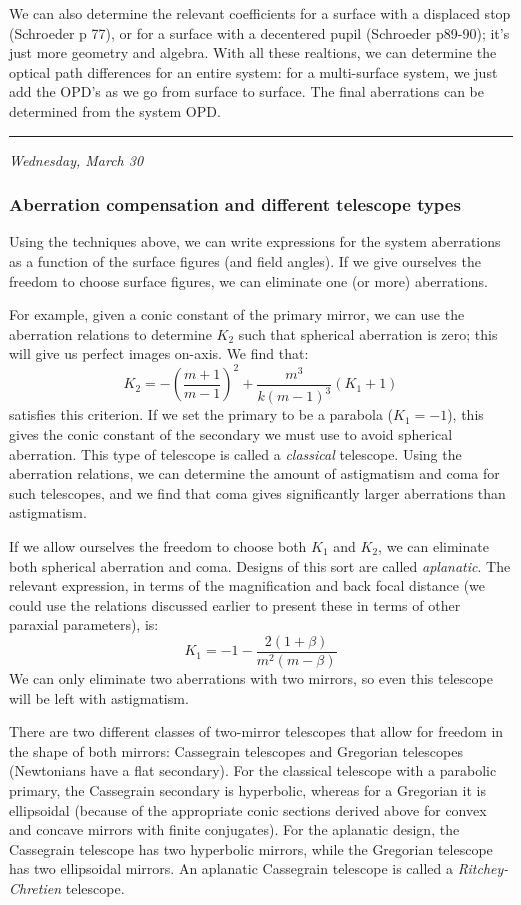 \documentclass[12pt]{article}
\newcommand{\mydate}[1]{
    \begin{flushright}
        \rule{\textwidth}{0.4pt} %
        \footnotesize\hfill\textit{#1}
    \end{flushright}}
\begin{document}
We can also determine the relevant coefficients for a surface with a displaced
stop (Schroeder p 77), or for a surface with a decentered pupil (Schroeder
p89-90); it's just more geometry and algebra. With all these realtions, we can
determine the optical path differences for an entire system: for a
multi-surface system, we just add the OPD's as we go from surface to surface.
The final aberrations can be determined from the system OPD.

\mydate{Wednesday, March 30}
\subsubsection{Aberration compensation and different telescope types}
Using the techniques above, we can write expressions for the system
aberrations as a function of the surface figures (and field angles).
If we give ourselves the freedom to choose surface figures, we can
eliminate one (or more) aberrations.

For example, given a conic constant of the primary mirror, we can use
the aberration relations to determine $K_{2}$ such that spherical
aberration is zero; this will give us perfect images on-axis. We find
that:
\[
    K_{2} =
    - \left( \frac{m+1}{m-1} \right) ^{2}
    + \frac{m^{3}}{k \left( m - 1 \right) ^{3}} \left( K_{1} + 1 \right)
    \]
satisfies this criterion.  If we set the primary to be a parabola ($K_{1} =
-1$), this gives the conic constant of the secondary we must use to avoid
spherical aberration. This type of telescope is called a \textit{classical}
telescope. Using the aberration relations, we can determine the amount of
astigmatism and coma for such telescopes, and we find that coma gives
significantly larger aberrations than astigmatism.

If we allow ourselves the freedom to choose both $K_{1}$ and $K_{2}$, we can
eliminate both spherical aberration and coma. Designs of this sort are called
\textit{aplanatic}. The relevant expression, in terms of the magnification and
back focal distance (we could use the relations discussed earlier to present
these in terms of other paraxial parameters), is:
\[
    K_{1} = -1 - \frac{2(1+\beta)}{m^{2}(m-\beta)}
    \]
We can only eliminate two aberrations with two mirrors, so even this
telescope will be left with astigmatism.

There are two different classes of two-mirror telescopes that allow
for freedom in the shape of both mirrors: Cassegrain telescopes and
Gregorian telescopes (Newtonians have a flat secondary). For the
classical telescope with a parabolic primary, the Cassegrain
secondary is hyperbolic, whereas for a Gregorian it is ellipsoidal
(because of the appropriate conic sections derived above for convex
and concave mirrors with finite conjugates). For the aplanatic
design, the Cassegrain telescope has two hyperbolic mirrors, while
the Gregorian telescope has two ellipsoidal mirrors. An aplanatic
Cassegrain telescope is called a \textit{Ritchey-Chretien} telescope.
\end{document}
